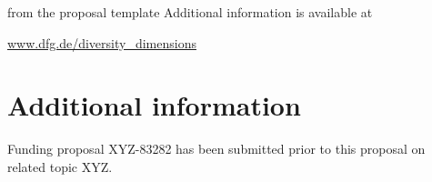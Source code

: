 \documentclass[    %
    gitinfo,       %
    noworkareas,   %
    RAM,           %
    general,       %
    \classoptions] %
    {dfgproposal}
\begin{document}
\begin{proposal}
\begin{todo}{from the proposal template}
	Additional information is available at
	
	\url{www.dfg.de/diversity_dimensions}
\end{todo}

\pagebreak
\setcounter{page}{1}




\section{Additional information }

Funding proposal XYZ-83282 has been submitted prior to this proposal on related topic XYZ.
\fi %
\end{proposal}
\end{document}
